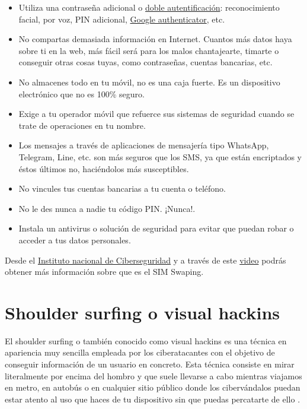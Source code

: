 \documentclass[
  a4paper,
  openany]{book}
\begin{document}
\begin{itemize}
\item
  Utiliza una contraseña adicional o \href{https://www.osi.es/es/actualidad/blog/2019/02/27/el-factor-de-autenticacion-doble-y-multiple}{doble autentificación}: reconocimiento facial, por voz, PIN adicional, \href{https://play.google.com/store/apps/details?id=com.google.android.apps.authenticator2\&hl=es\&gl=US}{Google authenticator}, etc.
\item
  No compartas demasiada información en Internet. Cuantos más datos haya sobre ti en la web, más fácil será para los malos chantajearte, timarte o conseguir otras cosas tuyas, como contraseñas, cuentas bancarias, etc.
\item
  No almacenes todo en tu móvil, no es una caja fuerte. Es un dispositivo electrónico que no es 100\% seguro.
\item
  Exige a tu operador móvil que refuerce sus sistemas de seguridad cuando se trate de operaciones en tu nombre.
\item
  Los mensajes a través de aplicaciones de mensajería tipo WhatsApp, Telegram, Line, etc. son más seguros que los SMS, ya que están encriptados y éstos últimos no, haciéndolos más susceptibles.
\item
  No vincules tus cuentas bancarias a tu cuenta o teléfono.
\item
  No le des nunca a nadie tu código PIN. ¡Nunca!.
\item
  Instala un antivirus o solución de seguridad para evitar que puedan robar o acceder a tus datos personales.
\end{itemize}

Desde el \href{https://www.incibe.es/}{Instituto nacional de Ciberseguridad} y a través de este \href{https://www.youtube.com/watch?v=fIaodow_nxw}{video} podrás obtener más información sobre que es el SIM Swaping.

\hypertarget{shoulder-surfing-o-visual-hackins}{%
\section{Shoulder surfing o visual hackins}\label{shoulder-surfing-o-visual-hackins}}

El shoulder surfing o también conocido como visual hackins es una técnica en apariencia muy sencilla empleada por los ciberatacantes con el objetivo de conseguir información de un usuario en concreto. Esta técnica consiste en mirar literalmente por encima del hombro y que suele llevarse a cabo mientras viajamos en metro, en autobús o en cualquier sitio público donde los cibervándalos puedan estar atento al uso que haces de tu dispositivo sin que puedas percatarte de ello \citep{OSI-shoulder-surfing}.
\end{document}
